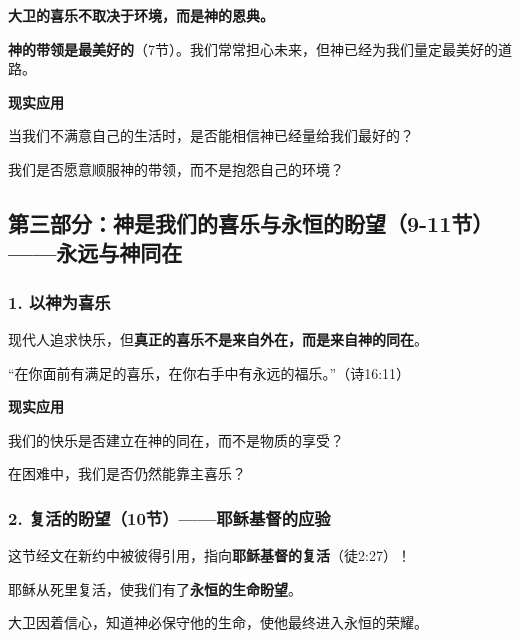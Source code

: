\documentclass[a4paper, 12pt]{article}
\begin{document}
\hspace{0.6cm}\textbf{大卫的喜乐不取决于环境，而是神的恩典。} 

\textbf{神的带领是最美好的}（7节）。我们常常担心未来，但神已经为我们量定最美好的道路。  

\vspace{0.2cm}

\textbf{现实应用} 

\hspace{0.6cm}当我们不满意自己的生活时，是否能相信神已经量给我们最好的？ 

\hspace{0.6cm}我们是否愿意顺服神的带领，而不是抱怨自己的环境？  

\subsection*{第三部分：神是我们的喜乐与永恒的盼望（9-11节）——永远与神同在 } 

\subsubsection*{1. 以神为喜乐}

\hspace{0.6cm}现代人追求快乐，但\textbf{真正的喜乐不是来自外在，而是来自神的同在}。  

“在你面前有满足的喜乐，在你右手中有永远的福乐。”（诗16:11）  

\vspace{0.2cm}


\textbf{现实应用} 

\hspace{0.6cm}我们的快乐是否建立在神的同在，而不是物质的享受？  

\hspace{0.6cm}在困难中，我们是否仍然能靠主喜乐？  

\subsubsection*{2. 复活的盼望（10节）——耶稣基督的应验 }

\hspace{0.6cm}这节经文在新约中被彼得引用，指向\textbf{耶稣基督的复活}（徒2:27）！ 

耶稣从死里复活，使我们有了\textbf{永恒的生命盼望}。  

大卫因着信心，知道神必保守他的生命，使他最终进入永恒的荣耀。

\vspace{0.2cm}
\end{document}
